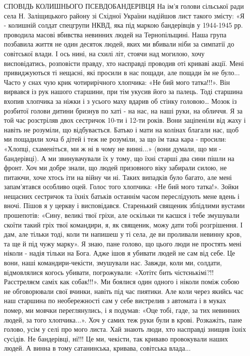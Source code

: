 СПОВІДЬ КОЛИШНЬОГО ПСЕВДОБАНДЕРІВЦЯ На ім’я голови сільської ради села Н.
Заліщицького району зі Східної України надійшов лист такого змісту: «Я -
колишній солдат спецгрупи НКВД, яка під маркою бандерівців у 1944-1945 рр.
проводила масові вбивства невинних людей на Тернопільщині. Наша група позбавила
життя не один десяток людей, яких ми вбивали ніби за симпатії до совітської
влади. І ось нині, на схилі літ, стоячи над могилою, хочу висповідатись,
розповісти правду, хто насправді проводив оті криваві акції. Мені привиджуються
ті нещасні, які просили в нас пощади, але пощади їм не було... Часто у снах чую
крик чотирирічного хлопчика: «Не бий мого татка!!!». Він вирвався із рук нашого
старшини, при тім укусив його за палець. Тоді старшина вхопив хлопчика за ніжки
і з усього маху вдарив об стінку головою… Мозок із розбитої голови дитини
бризнув по хаті - на нас, на наші руки, на обличчя. Я за той час розстріляв
двох сестричок 10-ти і 12-ти років. Вони заціпеніли від жаху і навіть не
розуміли, що відбувається. Батько і мати на колінах благали нас, щоб ми
пощадили хоча б дітей і теж не розуміли, за що їм така кара - просили: «Хлопці,
схаменіться, ми ж ні в чому не винні...» (вони думали, що ми - бандерівці). А
ми звинувачували їх у тому, що їхні старші два сини пішли на фронт. Хоч ми
добре знали, що людей призовного віку забирали силою, не питаючи, хоче хтось
іти на війну чи ні. Таких випадків було багато, але мені запам’ятався особливо
оцей. Голос того хлопчика: «Не бий мого татка!». Зойки нещасних сестричок та
їхніх батьків останнім часом переслідують мене вдень і вночі. Пішов я у церкву
і висповідався. Старенький священик зблідлими вустами прошепотів: «Сину, великі
твої гріхи, але оскільки ти каєшся і тебе змушували скоїти такий гріх твої
командири, я, як священик, можу дати тобі розгрішення. І дам, але тільки тоді,
коли ти напишеш у ті села, де ви проливали невинну кров, та ще й під чужу
марку». Я знаю, пане голово, що цього люди не простять мені ніколи - надія
тільки на Бога. Адже ішов я убивати людей не сам від себе. Це вони, наші
командири-чекісти, змушували нас. Завжди, коли ми, солдати, відмовлялися когось
убивати, погрожували: «Хотітє бить чістєнькімі?!! Расстреляєм саміх как
собак!!!». Ми боялися один одного і ніколи поміж собою не обговорювали свої
вчинки, навіть під час пиятики. Але коли через якийсь час наш старшина по
необережності сам у себе вистрелив з автомата і в муках помер, ми мовчки
переглянулись, і я подумав: «Оце тобі, гаде, за тих невинних людей, за того
хлопчика...». Хоч у самих теж руки були в крові. Розкажіть, пане голово, усім у
селі про мого листа. Хай знають люди, хто насправді знищив їхніх сусідів. Не
бандерівці, ні!!! Це ми, чекісти, так криваво провокували наших людей. А винна
в тому сатанинська, кривава, совітська влада...

